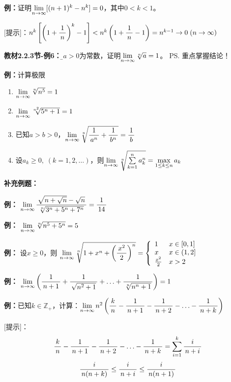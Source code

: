 {\bf 例：}证明$\limn [(n+1)^k-{n}^k]=0$，其中$0<k<1$。

[提示]：$n^k\left[\left(1+\df1n\right)^k-1\right]
<n^k\left(1+\df1n-1\right)=n^{k-1}\to 0\;(n\to\infty)$

\bigskip

{\bf 教材2.2.3节-例6：}{\b 设$a>0$为常数，证明$\limn \sqrt[n]{a}=1$。}
\ps{重点掌握结论！}

{\bf 例：}计算极限
\begin{enumerate}[(1)]
  \setlength{\itemindent}{1cm}
  \item $\limn\sqrt[n]{n^5}=1$
  \item $\limn\sqrt[n^2]{5^n+1}=1$
  \item 已知$a>b>0$，$\limn\sqrt[n]{\df1{a^n}+\df1{b^n}}=\df1b$
  \item 设$a_k\geq0,\;(k=1,2,\ldots)$，则$\limn\sqrt[n]
  {\sum\limits_{k=1}^na_k^n}=\max\limits_{1\leq k\leq n}a_k$
\end{enumerate}
 
{\bf 补充例题：}

{\bf 例：} $\limn\df{\sqrt{n+\sqrt n}-\sqrt n}{\sqrt[n]{3^n+5^n+7^n}}=\df1{14}$


{\bf 例：} $\limn\sqrt[n]{n^5+5^n}=5$

{\bf 例：} 设$x\geq 0$，则
$\limn\sqrt[n]{1+x^n+\left(\df{x^2}2\right)^n}=
\left\{\begin{array}{ll}
1&x\in[0,1]\\ x & x\in(1,2]\\ \frac{x^2}2& x>2
\end{array}\right.$

{\bf 例：} $\limn\left(\df1{n+1}+\df1{\sqrt{n^2+1}}+\ldots
+\df1{\sqrt[n]{n^n+1}}\right)=1$

{\bf 例：}已知$k\in\mathbb{Z}_+$，计算：$\limn n^2\left(\df kn-\df1{n+1}-\df1{n+2}
-\ldots-\df1{n+k}\right)$

[提示]：
$$\df kn-\df1{n+1}-\df1{n+2}-\ldots-\df1{n+k}=\sum\limits_{i=1}^k\df{i}{n+i}$$
$$\df i{n(n+k)}\leq\df{i}{n+i}\leq\df i{n(n+1)}$$

